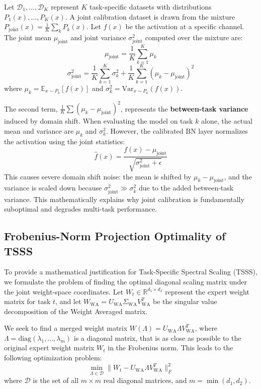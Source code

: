 \documentclass{article}
\theoremstyle{plain}
\theoremstyle{definition}
\theoremstyle{remark}
\begin{document}
Let $\mathcal{D}_1, \dots, \mathcal{D}_K$ represent $K$ task-specific datasets with distributions $P_1(x), \dots, P_K(x)$. A joint calibration dataset is drawn from the mixture $P_{\text{joint}}(x) = \frac{1}{K}\sum_k P_k(x)$.
Let $f(x)$ be the activation at a specific channel. The joint mean $\mu_{\text{joint}}$ and joint variance $\sigma^2_{\text{joint}}$ computed over the mixture are:
\begin{equation}
    \mu_{\text{joint}} = \frac{1}{K}\sum_{k=1}^K \mu_k
\end{equation}
\begin{equation}
    \sigma^2_{\text{joint}} = \frac{1}{K}\sum_{k=1}^K \sigma^2_k + \frac{1}{K}\sum_{k=1}^K (\mu_k - \mu_{\text{joint}})^2
\end{equation}
where $\mu_k = \mathbb{E}_{x \sim P_k}[f(x)]$ and $\sigma^2_k = \text{Var}_{x \sim P_k}(f(x))$.

The second term, $\frac{1}{K}\sum (\mu_k - \mu_{\text{joint}})^2$, represents the \textbf{between-task variance} induced by domain shift. When evaluating the model on task $k$ alone, the actual mean and variance are $\mu_k$ and $\sigma^2_k$. However, the calibrated BN layer normalizes the activation using the joint statistics:
\begin{equation}
    \hat{f}(x) = \frac{f(x) - \mu_{\text{joint}}}{\sqrt{\sigma^2_{\text{joint}} + \epsilon}}
\end{equation}
This causes severe domain shift noise: the mean is shifted by $\mu_k - \mu_{\text{joint}}$, and the variance is scaled down because $\sigma^2_{\text{joint}} \gg \sigma^2_k$ due to the added between-task variance. This mathematically explains why joint calibration is fundamentally suboptimal and degrades multi-task performance.

\subsection{Frobenius-Norm Projection Optimality of TSSS}
To provide a mathematical justification for Task-Specific Spectral Scaling (TSSS), we formulate the problem of finding the optimal diagonal scaling matrix under the joint weight-space coordinates. Let $W_t \in \mathbb{R}^{d_1 \times d_2}$ represent the expert weight matrix for task $t$, and let $W_{\text{WA}} = U_{\text{WA}} \Sigma_{\text{WA}} V_{\text{WA}}^T$ be the singular value decomposition of the Weight Averaged matrix.

We seek to find a merged weight matrix $W(\Lambda) = U_{\text{WA}} \Lambda V_{\text{WA}}^T$, where $\Lambda = \text{diag}(\lambda_1, \dots, \lambda_m)$ is a diagonal matrix, that is as close as possible to the original expert weight matrix $W_t$ in the Frobenius norm. This leads to the following optimization problem:
\begin{equation}
    \min_{\Lambda \in \mathcal{D}} \| W_t - U_{\text{WA}} \Lambda V_{\text{WA}}^T \|_F^2
\end{equation}
where $\mathcal{D}$ is the set of all $m \times m$ real diagonal matrices, and $m = \min(d_1, d_2)$.
\end{document}
